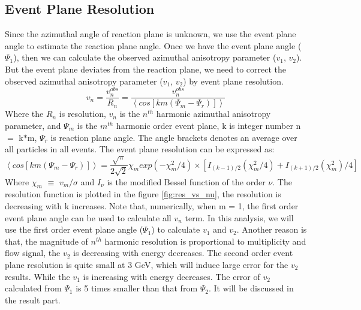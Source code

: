 \subsection{Event Plane Resolution}
Since the azimuthal angle of reaction plane is unknown, we use the event plane angle to estimate the reaction plane angle. Once we have the event plane angle ($\Psi_{1}$), then we can calculate the observed azimuthal anisotropy parameter ($v_{1}$, $v_{2}$). But the event plane deviates from the reaction plane, we need to correct the observed azimuthal anisotropy parameter ($v_{1}$, $v_{2}$) by event plane resolution. 
\begin{equation}
	v_{n} = \frac{v_{n}^{obs}}{R_{n}}
	=\frac{v_{n}^{obs}}{\left< cos[km(\Psi_{m}-\Psi_{r})] \right>}
	\label{equ:vn_cal}
\end{equation}
Where the $R_{n}$ is resolution, $v_{n}$ is the $n^{th}$ harmonic azimuthal anisotropy parameter, and $\Psi_{m}$ is the $m^{th}$ harmonic order event plane, k is integer number n $=$ k$*$m, $\Psi_{r}$ is reaction plane angle. The angle brackets denotes an average over all particles in all events. The event plane resolution can be expressed as:
\begin{equation}
	\left< cos[km(\Psi_{m}-\Psi_{r})] \right>=
	\frac{\sqrt{\pi}}{2\sqrt{2}}\chi_{m}exp(-\chi_{m}^{2}/4) \times
	[I_{(k-1)/2}(\chi_{m}^{2}/4)+I_{(k+1)/2}(\chi_{m}^{2})/4]
\end{equation}
Where $\chi_{m}$ $\equiv$ $v_{m}$$/$$\sigma$ and $I_{\nu}$ is the modified Bessel function of the order $\nu$. The resolution function is plotted in the figure \ref{fig:res_vs_nu}, the resolution is decreasing with k increases. Note that, numerically, when m = 1, the first order event plane angle can be used to calculate all $v_{n}$ term. In this analysis, we will use the first order event plane angle ($\Psi_{1}$) to calculate $v_{1}$ and $v_{2}$. Another reason is that, the magnitude of $n^{th}$ harmonic resolution is proportional to multiplicity and flow signal, the $v_{2}$ is decreasing with energy decreases. The second order event plane resolution is quite small at 3 GeV, which will induce large error for the $v_{2}$ results. While the $v_{1}$ is increasing with energy decreases. The error of $v_{2}$ calculated from $\Psi_{1}$ is 5 times smaller than that from $\Psi_{2}$. It will be discussed in the result part.


